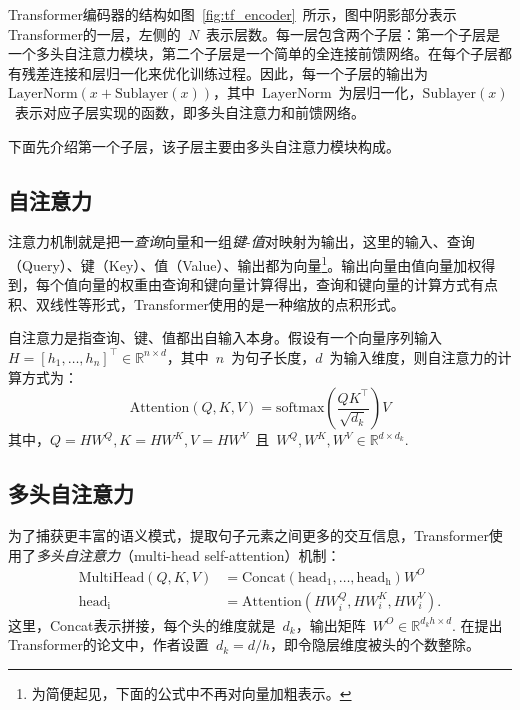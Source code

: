 Transformer编码器的结构如图~\ref{fig:tf_encoder}~所示，图中阴影部分表示Transformer的一层，左侧的~$N$~表示层数。每一层包含两个子层：第一个子层是一个多头自注意力模块，第二个子层是一个简单的全连接前馈网络。在每个子层都有残差连接\cite{DBLP:conf/cvpr/HeZRS16}和层归一化\cite{lei2016layer}来优化训练过程。因此，每一个子层的输出为~$\mathrm{LayerNorm}(x+\mathrm{Sublayer}(x))$，其中~$\mathrm{LayerNorm}$~为层归一化，$\mathrm{Sublayer}(x)$~表示对应子层实现的函数，即多头自注意力和前馈网络。

下面先介绍第一个子层，该子层主要由多头自注意力模块构成。

\subsection{自注意力}
注意力机制就是把一\emph{查询}向量和一组\emph{键}-\emph{值}对映射为输出，这里的输入、查询（Query）、键（Key）、值（Value）、输出都为向量\footnote{为简便起见，下面的公式中不再对向量加粗表示。}。输出向量由值向量加权得到，每个值向量的权重由查询和键向量计算得出，查询和键向量的计算方式有点积、双线性等形式，Transformer使用的是一种缩放的点积形式。

自注意力是指查询、键、值都出自输入本身。假设有一个向量序列输入~$H = [h_1, \hdots, h_n]^\top \in \mathbb{R}^{n\times d}$，其中~$n$~为句子长度，$d$~为输入维度，则自注意力的计算方式为：
\begin{equation}
	\mathrm{Attention}(Q,K,V) = \mathrm{softmax}(\frac{QK^\top}{\sqrt{d_k}})V
\end{equation}
其中，$Q=HW^Q, K=HW^K, V=HW^V$\ 且\ $W^Q, W^K, W^V\in \mathbb{R}^{d\times d_k}$. 

\subsection{多头自注意力}
为了捕获更丰富的语义模式，提取句子元素之间更多的交互信息，Transformer使用了\emph{多头自注意力}（multi-head self-attention）机制：
\begin{equation}
	\begin{aligned}
	\mathrm{MultiHead}(Q,K,V)& = \mathrm{Concat}(\mathrm{head_1}, \hdots, \mathrm{head_h})W^O
	\\
	\mathrm{head_i} &= \mathrm{Attention}(HW_i^Q, HW_i^K, HW_i^V).
	\end{aligned}
\end{equation}
这里，Concat表示拼接，每个头的维度就是~$d_k$，输出矩阵~$W^O\in \mathbb{R}^{d_kh \times d}$. 在提出Transformer的论文中，作者设置~$d_k=d/h$，即令隐层维度被头的个数整除。

